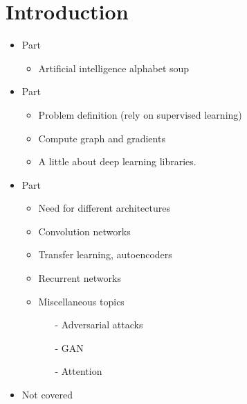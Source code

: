 \section{Introduction}
\begin{frame}{}
	\begin{itemize}
		\item Part  
		\begin{itemize}
			\item Artificial intelligence alphabet soup 
		\end{itemize}
		\item Part 	
			\begin{itemize}
				\item Problem definition (rely on supervised learning)
				\item Compute graph and gradients 
				\item A little about deep learning libraries. 
			\end{itemize}
		\item Part 
			\begin{itemize}
				\item Need for different architectures
				\item Convolution networks
				\item Transfer learning, autoencoders
				\item Recurrent networks  
				\item Miscellaneous topics
					\begin{itemize}
						\item[-] Adversarial attacks 
						\item[-] GAN 
						\item[-] Attention 
					\end{itemize}
			\end{itemize}
		\item Not covered 
	\end{itemize}
\end{frame}

